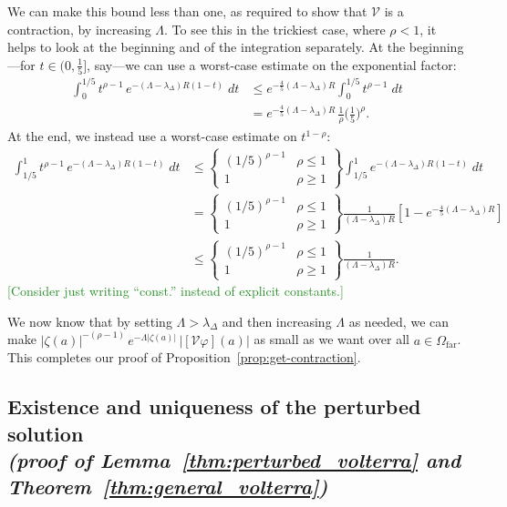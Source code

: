 \documentclass{article}
\theoremstyle{plain}
\newcommand{\volterra}{\mathcal{V}}
\newcommand{\far}{\Omega_\text{far}}
\begin{document}
We can make this bound less than one, as required to show that $\volterra$ is a contraction, by increasing $\Lambda$. To see this in the trickiest case, where $\rho < 1$, it helps to look at the beginning and of the integration separately. At the beginning---for $t \in \big(0, \tfrac{1}{5}\big]$, say---we can use a worst-case estimate on the exponential factor:
\begin{align*}
\int_0^{1/5} t^{\rho-1}\,e^{-(\Lambda - \lambda_\Delta)R(1 - t)}\;dt & \le e^{-\frac{4}{5}(\Lambda - \lambda_\Delta)R} \int_0^{1/5} t^{\rho-1}\;dt \\
& = e^{-\frac{4}{5}(\Lambda - \lambda_\Delta)R}\,\tfrac{1}{\rho} \big(\tfrac{1}{5}\big)^\rho.
\end{align*}
At the end, we instead use a worst-case estimate on $t^{1-\rho}$:
\begin{align*}
\int_{1/5}^1 t^{\rho-1}\,e^{-(\Lambda - \lambda_\Delta)R(1 - t)}\;dt & \le \left\{\begin{array}{cc}(1/5)^{\rho-1} & \rho \le 1 \\ 1 & \rho \ge 1 \end{array}\right\} \int_{1/5}^1 e^{-(\Lambda - \lambda_\Delta)R(1 - t)}\;dt \\
& = \left\{\begin{array}{cc}(1/5)^{\rho-1} & \rho \le 1 \\ 1 & \rho \ge 1 \end{array}\right\} \frac{1}{(\Lambda - \lambda_\Delta)R}\left[ 1 - e^{-\tfrac{4}{5}(\Lambda - \lambda_\Delta)R} \right] \\
& \le \left\{\begin{array}{cc}(1/5)^{\rho-1} & \rho \le 1 \\ 1 & \rho \ge 1 \end{array}\right\} \frac{1}{(\Lambda - \lambda_\Delta)R}.
\end{align*}
\textcolor{ForestGreen}{[Consider just writing ``const.'' instead of explicit constants.]}

We now know that by setting $\Lambda > \lambda_\Delta$ and then increasing $\Lambda$ as needed, we can make $|\zeta(a)|^{-(\rho-1)}\,e^{-\Lambda|\zeta(a)|}\,|[\volterra\varphi](a)|$ as small as we want over all $a \in \far$. This completes our proof of Proposition~\ref{prop:get-contraction}.
\subsection{Existence and uniqueness of the perturbed solution \\ \textit{(proof of Lemma~\ref{thm:perturbed_volterra} and Theorem~\ref{thm:general_volterra})}}
\end{document}
